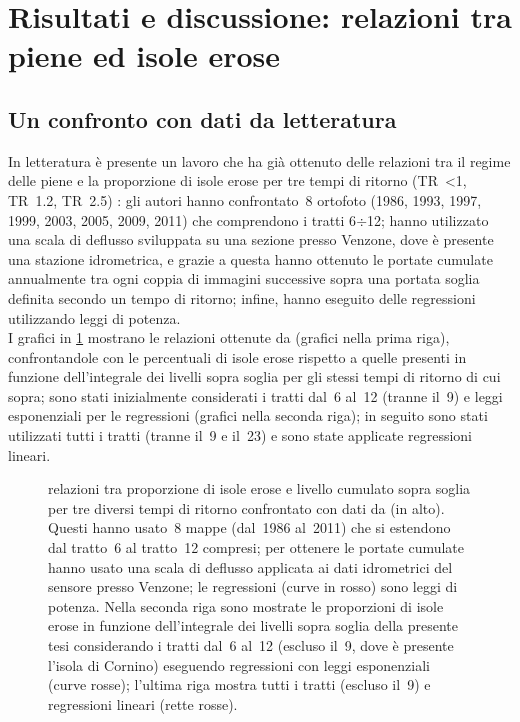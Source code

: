 \section{Risultati e discussione: relazioni tra piene ed isole erose}
\subsection{Un confronto con dati da letteratura}
In letteratura è presente un lavoro che ha già ottenuto delle relazioni tra il regime delle piene e la proporzione di isole erose per tre tempi di ritorno (TR~\SI{<1}{\anno}, TR~\SI{1.2}{\anni}, TR~\SI{2.5}{\anni}) :
gli autori hanno confrontato~8 ortofoto (1986, 1993, 1997, 1999, 2003, 2005, 2009, 2011) che comprendono i tratti 6$\div$12;
hanno utilizzato una scala di deflusso sviluppata su una sezione presso Venzone, dove è presente una stazione idrometrica, e grazie a questa hanno ottenuto le portate cumulate annualmente tra ogni coppia di immagini successive sopra una portata soglia definita secondo un tempo di ritorno;
infine, hanno eseguito delle regressioni utilizzando leggi di potenza.
\\
I grafici in \cref{graph:relazioni-piene-erosione-vs-surian} mostrano le relazioni ottenute da  (grafici nella prima riga), confrontandole con le percentuali di isole erose rispetto a quelle presenti in funzione dell'integrale dei livelli sopra soglia per gli stessi tempi di ritorno di cui sopra; sono stati inizialmente considerati i tratti dal~6 al~12 (tranne il~9) e leggi esponenziali per le regressioni (grafici nella seconda riga); in seguito sono stati utilizzati tutti i tratti (tranne il~9 e il~23) e sono state applicate regressioni lineari.
%
\begin{figure}
	\centering
	
	\vspace*{-0.7cm}
	\caption[relazioni tra proporzione di isole erose e livello cumulato sopra soglia confrontato con dati da ]{relazioni tra proporzione di isole erose e livello cumulato sopra soglia per tre diversi tempi di ritorno confrontato con dati da  (in alto).
	Questi hanno usato~8 mappe (dal~1986 al~2011) che si estendono dal tratto~6 al tratto~12 compresi; per ottenere le portate cumulate hanno usato una scala di deflusso applicata ai dati idrometrici del sensore presso Venzone; le regressioni (curve in rosso) sono leggi di potenza.
	Nella seconda riga sono mostrate le proporzioni di isole erose in funzione dell'integrale dei livelli sopra soglia della presente tesi considerando i tratti dal~6 al~12 (escluso il~9, dove è presente l'isola di Cornino) eseguendo regressioni con leggi esponenziali (curve rosse); l'ultima riga mostra tutti i tratti (escluso il~9) e regressioni lineari (rette rosse).}
	\label{graph:relazioni-piene-erosione-vs-surian}
\end{figure}
